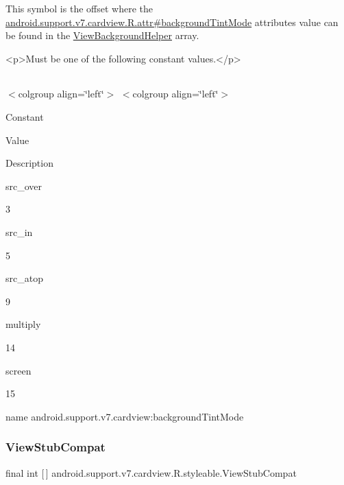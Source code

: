 This symbol is the offset where the \hyperlink{classandroid_1_1support_1_1v7_1_1cardview_1_1R_1_1attr_afb91022bf77beda3662ed71a44e449a0}{android.\+support.\+v7.\+cardview.\+R.\+attr\#background\+Tint\+Mode} attribute\textquotesingle{}s value can be found in the \hyperlink{classandroid_1_1support_1_1v7_1_1cardview_1_1R_1_1styleable_a5b548c410f0942ef83e14ce4020235ca}{View\+Background\+Helper} array.

\begin{DoxyVerb}      <p>Must be one of the following constant values.</p>
\end{DoxyVerb}
 \tabulinesep=1mm
\begin{longtabu} spread 0pt [c]{*{0}{|X[-1]}|}
\hline
\end{longtabu}
$<$colgroup align=\char`\"{}left\char`\"{}$>$ $<$colgroup align=\char`\"{}left\char`\"{}$>$ 

Constant

Value

Description 

{\ttfamily src\+\_\+over}

3

{\ttfamily src\+\_\+in}

5

{\ttfamily src\+\_\+atop}

9

{\ttfamily multiply}

14

{\ttfamily screen}

15

name android.\+support.\+v7.\+cardview\+:background\+Tint\+Mode \mbox{\label{classandroid_1_1support_1_1v7_1_1cardview_1_1R_1_1styleable_a3c298cbf9f98a627c6843548f42a8a58}} 
\subsubsection{\texorpdfstring{View\+Stub\+Compat}{ViewStubCompat}}
{\footnotesize\ttfamily final int \mbox{[}$\,$\mbox{]} android.\+support.\+v7.\+cardview.\+R.\+styleable.\+View\+Stub\+Compat\hspace{0.3cm}{\ttfamily [static]}}

